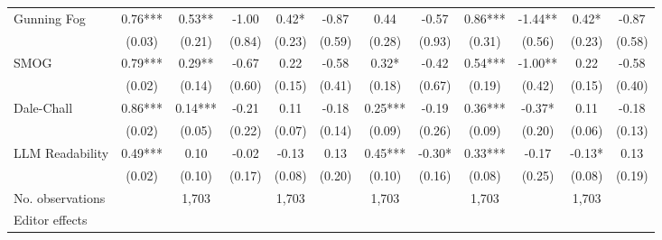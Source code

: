 \begin{table}
\begin{threeparttable}
\begin{tabular}{p{3cm}S@{}S@{}S@{}S@{}S@{}S@{}S@{}S@{}S@{}S@{}S@{}}
            Gunning Fog                   &        0.76***&        0.53** &       -1.00   &        0.42*  &       -0.87   &        0.44   &       -0.57   &        0.86***&       -1.44** &        0.42*  &       -0.87   \\
                                          &      (0.03)   &      (0.21)   &      (0.84)   &      (0.23)   &      (0.59)   &      (0.28)   &      (0.93)   &      (0.31)   &      (0.56)   &      (0.23)   &      (0.58)   \\
            SMOG                          &        0.79***&        0.29** &       -0.67   &        0.22   &       -0.58   &        0.32*  &       -0.42   &        0.54***&       -1.00** &        0.22   &       -0.58   \\
                                          &      (0.02)   &      (0.14)   &      (0.60)   &      (0.15)   &      (0.41)   &      (0.18)   &      (0.67)   &      (0.19)   &      (0.42)   &      (0.15)   &      (0.40)   \\
            Dale-Chall                    &        0.86***&        0.14***&       -0.21   &        0.11   &       -0.18   &        0.25***&       -0.19   &        0.36***&       -0.37*  &        0.11   &       -0.18   \\
                                          &      (0.02)   &      (0.05)   &      (0.22)   &      (0.07)   &      (0.14)   &      (0.09)   &      (0.26)   &      (0.09)   &      (0.20)   &      (0.06)   &      (0.13)   \\
            LLM Readability        &        0.49***&        0.10   &       -0.02   &       -0.13   &        0.13   &        0.45***&       -0.30*  &        0.33***&       -0.17   &       -0.13*  &        0.13   \\
                                          &      (0.02)   &      (0.10)   &      (0.17)   &      (0.08)   &      (0.20)   &      (0.10)   &      (0.16)   &      (0.08)   &      (0.25)   &      (0.08)   &      (0.19)   \\
            \midrule
            No. observations              &               &       1,703   &               &       1,703   &               &       1,703   &               &       1,703   &               &       1,703   &               \\
            \midrule
            Editor effects        &               &           {}   &               &           {}   &               &           {}   &               &           {}   &               &               &               \\

\end{tabular}
\end{threeparttable}
\end{table}
